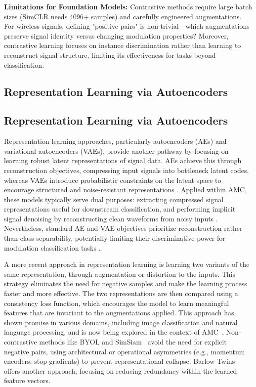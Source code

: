 \textbf{Limitations for Foundation Models:} Contrastive methods require large batch sizes (SimCLR needs 4096+ samples) and carefully engineered augmentations. For wireless signals, defining "positive pairs" is non-trivial—which augmentations preserve signal identity versus changing modulation properties? Moreover, contrastive learning focuses on instance discrimination rather than learning to reconstruct signal structure, limiting its effectiveness for tasks beyond classification.

\subsection{Representation Learning via Autoencoders}

\subsection{Representation Learning via Autoencoders}

Representation learning approaches, particularly autoencoders (AEs) and variational autoencoders (VAEs), provide another pathway by focusing on learning robust latent representations of signal data. AEs achieve this through reconstruction objectives, compressing input signals into bottleneck latent codes, whereas VAEs introduce probabilistic constraints on the latent space to encourage structured and noise-resistant representations \cite{kingma2014vae}. Applied within AMC, these models typically serve dual purposes: extracting compressed signal representations useful for downstream classification, and performing implicit signal denoising by reconstructing clean waveforms from noisy inputs \cite{an2015variational,jiang2019semi}. Nevertheless, standard AE and VAE objectives prioritize reconstruction rather than class separability, potentially limiting their discriminative power for modulation classification tasks \cite{an2015variational}.

A more recent approach in representation learning is learning two variants of the same representation, through augmentation or distortion to the inputs. This strategy eliminates the need for negative samples and make the learning process faster and more effective. The two representations are then compared using a consistency loss function, which encourages the model to learn meaningful features that are invariant to the augmentations applied. This approach has shown promise in various domains, including image classification and natural language processing, and is now being explored in the context of AMC~\cite{10034661}. Non-contrastive methods like BYOL \cite{grill2020bootstrap} and SimSiam~\cite{chen2020exploring} avoid the need for explicit negative pairs, using architectural or operational asymmetries (e.g., momentum encoders, stop-gradients) to prevent representational collapse. Barlow Twins \cite{zbontar2021barlow} offers another approach, focusing on reducing redundancy within the learned feature vectors.

